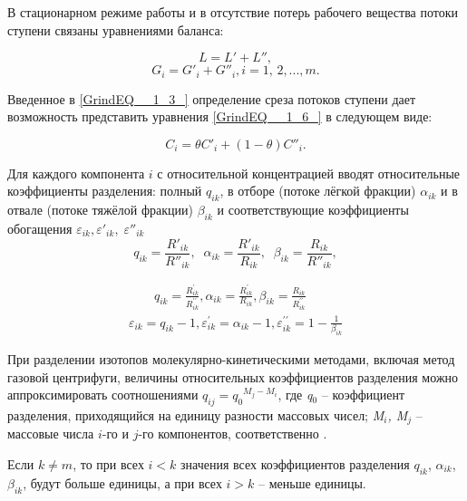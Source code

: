 В стационарном режиме работы и в отсутствие потерь рабочего вещества потоки ступени связаны уравнениями баланса:

\begin{equation} \label{GrindEQ__1_5_} 
  L=L'+L'', 
  \end{equation} 
  \begin{equation} \label{GrindEQ__1_6_} 
  G_{i} =G'_{i} +G''_{i} , i=1,\, 2,...,m.             
\end{equation} 
  

Введенное в \ref{GrindEQ__1_3_} определение среза потоков ступени дает возможность представить уравнения \ref{GrindEQ__1_6_} в следующем виде:

\begin{equation} \label{GrindEQ__1_7_} 
  C_{i} =\theta C'_{i} +(1-\theta )C''_{i} . 
\end{equation} 

Для каждого компонента $i$ с относительной концентрацией вводят относительные коэффициенты разделения: полный $q_{ik}$, в отборе (потоке лёгкой фракции) $\alpha _{ik} $ и в отвале (потоке тяжёлой фракции) $\beta _{ik} $ и соответствующие коэффициенты обогащения $\varepsilon _{ik} ,\varepsilon '_{ik} ,\; \varepsilon ''_{ik} \; $
\[q_{ik} =\frac{R'_{ik} }{R''_{ik} } ,\; \; \alpha _{ik} =\frac{R'_{ik} }{R_{ik} } ,\; \; \beta _{ik} =\frac{R_{ik} }{R''_{ik} } ,\] 

\begin{equation} \label{GrindEQ__1_11_} 
  \begin{array}{l}
    \qquad q_{i k}=\frac{R_{i k}^{\prime}}{R_{i k}^{\prime \prime}}, \alpha_{i k}=\frac{R_{i k}^{\prime}}{R_{i k}}, \beta_{i k}=\frac{R_{i k}}{R_{i k}^{\prime \prime}} \\
    \varepsilon_{i k}=q_{i k}-1, \varepsilon_{i k}^{\prime}=\alpha_{i k}-1, \varepsilon_{i k}^{\prime \prime}=1-\frac{1}{\beta_{i k}}
    \end{array}
\end{equation} 

При разделении изотопов молекулярно-кинетическими методами, включая метод газовой центрифуги, величины относительных коэффициентов разделения можно аппроксимировать соотношениями $q_{ij} =q_{0} {}^{M_{j} -M_{i} }$, где \textit{q}${}_{0}$ – коэффициент разделения, приходящийся на единицу разности массовых чисел; \textit{M${}_{i}$, M${}_{j}$} – массовые числа $i$-го и $j$-го компонентов, соответственно \cite{sulaberidzeTeoriyaKaskadovDlya2011}.

Если $k\ne m$, то при всех $i<k$ значения всех коэффициентов разделения $q_{ik} $, $\alpha _{ik} $, $\beta _{ik} $, будут больше единицы, а при всех $i>k$ -- меньше единицы.

